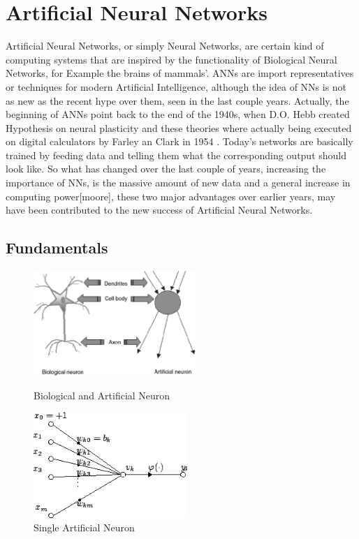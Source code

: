\chapter{Artificial Neural Networks}\label{chapter:Related Work}
Artificial Neural Networks, or simply Neural Networks, are certain kind of computing systems that are inspired by the functionality of Biological Neural Networks, for Example the brains of mammals'. ANNs are import representatives or techniques for modern Artificial Intelligence, although the idea of NNs is not as new as the recent hype over them, seen in the last couple years. Actually, the beginning of ANNs point back to the end of the 1940s, when D.O. Hebb created Hypothesis on neural plasticity \cite{hebb} and these theories where actually being executed on digital calculators by Farley an Clark in 1954 \cite{farleyclark}. Today's networks are basically trained by feeding data and telling them what the corresponding output should look like. So what has changed over the last couple of years, increasing the importance of NNs, is the massive amount of new data and a general increase in computing power[moore], these two major advantages over earlier years, may have been contributed to the new success of Artificial Neural Networks.

\section{Fundamentals}

\begin{figure}[H]
	\centering
	\includegraphics[height=4cm]{images/Fig-1-Analogy-between-artificial-neuron-and-biological-neuron.png}
	\caption{Biological and Artificial Neuron \cite{analogyneurons}}
	\label{fig:artifical_and_biological}
	\endminipage\hfill
	\includegraphics[height=4cm]{images/artificial_neuron.png}
	\caption{Single Artificial Neuron \cite{artificialneuron}}
	\label{fig:artificial_neuron}
	\endminipage
\end{figure}

